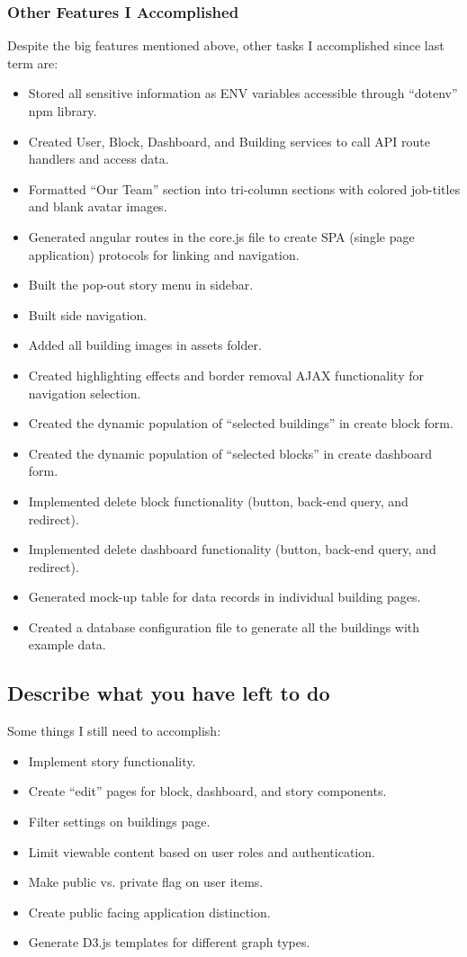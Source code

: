 \documentclass[letterpaper,10pt,serif,draftclsnofoot,onecolumn,compsoc,titlepage]{IEEEtran}
\begin{document}
\subsubsection{Other Features I Accomplished}
Despite the big features mentioned above, other tasks I accomplished since last term are:
\begin{itemize}
  \item Stored all sensitive information as ENV variables accessible through ``dotenv'' npm library.
  \item Created User, Block, Dashboard, and Building services to call API route handlers and access data.
  \item Formatted ``Our Team'' section into tri-column sections with colored job-titles and blank avatar images.
  \item Generated angular routes in the core.js file to create SPA (single page application) protocols for linking and navigation.
  \item Built the pop-out story menu in sidebar.
  \item Built side navigation.
  \item Added all building images in assets folder.
  \item Created highlighting effects and border removal AJAX functionality for navigation selection.
  \item Created the dynamic population of ``selected buildings'' in create block form. 
  \item Created the dynamic population of ``selected blocks'' in create dashboard form. 
  \item Implemented delete block functionality (button, back-end query, and redirect).
  \item Implemented delete dashboard functionality (button, back-end query, and redirect).
  \item Generated mock-up table for data records in individual building pages.
  \item Created a database configuration file to generate all the buildings with example data.
\end{itemize}
\subsection{Describe what you have left to do}
Some things I still need to accomplish:
\begin{itemize}
  \item Implement story functionality.
  \item Create ``edit'' pages for block, dashboard, and story components.
  \item Filter settings on buildings page.
  \item Limit viewable content based on user roles and authentication.
  \item Make public vs. private flag on user items.
  \item Create public facing application distinction.
  \item Generate D3.js templates for different graph types.
\end{itemize}
\end{document}
